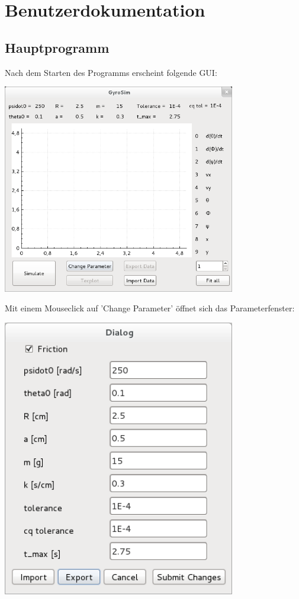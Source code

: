 \chapter{Benutzerdokumentation}
\label{ch:4}
\section{Hauptprogramm}
Nach dem Starten des Programms erscheint folgende GUI:

\includegraphics[width=4in,keepaspectratio=true]{figures/mainwindow_clean.png}
\newpage

Mit einem Mouseclick auf 'Change Parameter' \"offnet sich das Parameterfenster:

\includegraphics[width=4in,keepaspectratio=true]{figures/change_parameter_default.png}
\newpage

